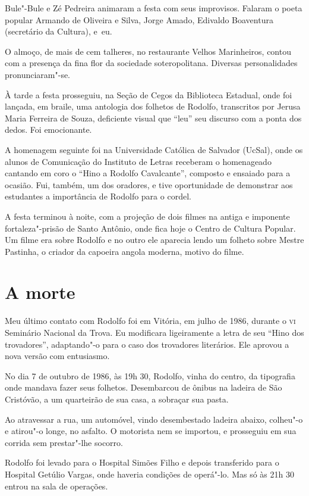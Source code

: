Bule"-Bule e Zé Pedreira animaram a festa com seus improvisos. Falaram
o poeta popular Armando de Oliveira e Silva, Jorge Amado, Edivaldo
Boaventura (secretário da Cultura), \mbox{e eu}.

O almoço, de mais de cem talheres, no restaurante Velhos Marinheiros,
contou com a presença da fina flor da sociedade soteropolitana.
Diversas personalidades pronunciaram"-se.

À tarde a festa prosseguiu, na Seção de Cegos da Biblioteca Estadual,
onde foi lançada, em braile, uma antologia dos folhetos de Rodolfo,
transcritos por Jerusa Maria Ferreira de Souza, deficiente visual que
``leu'' seu discurso com a ponta dos dedos.
Foi emocionante.

A homenagem seguinte foi na Universidade Católica de Salvador (UcSal),
onde os alunos de Comunicação do Instituto de Letras receberam o
homenageado cantando em coro o ``Hino a Rodolfo
Cavalcante'', composto e ensaiado para a ocasião. Fui,
também, um dos oradores, e tive oportunidade de demonstrar aos
estudantes a importância de Rodolfo para o cordel.

A festa terminou à noite, com a projeção de dois filmes na antiga e
imponente fortaleza"-prisão de Santo Antônio, onde fica hoje o Centro
de Cultura Popular. Um filme era sobre Rodolfo e no outro ele aparecia
lendo um folheto sobre Mestre Pastinha, o criador da capoeira angola
moderna, motivo do filme.


\section{A morte}

Meu último contato com Rodolfo foi em Vitória, em julho de 1986,
durante o \textsc{vi} Seminário Nacional da Trova. Eu modificara ligeiramente a
letra de seu ``Hino dos trovadores'',
adaptando"-o para o caso dos trovadores literários. Ele aprovou a nova
versão com entusiasmo.

No dia 7 de outubro de 1986, às 19h 30, Rodolfo, vinha do centro, da
tipografia onde mandava fazer seus folhetos. Desembarcou de ônibus na
ladeira de São Cristóvão, a um quarteirão de sua casa, a sobraçar sua
pasta.

Ao atravessar a rua, um automóvel, vindo desembestado ladeira abaixo,
colheu"-o e atirou"-o longe, no asfalto. O motorista nem se importou,
e prosseguiu em sua corrida sem prestar"-lhe socorro.

Rodolfo foi levado para o Hospital Simões Filho e depois transferido
para o Hospital Getúlio Vargas, onde haveria condições de operá"-lo.
Mas só às 21h 30 entrou na sala de operações.

